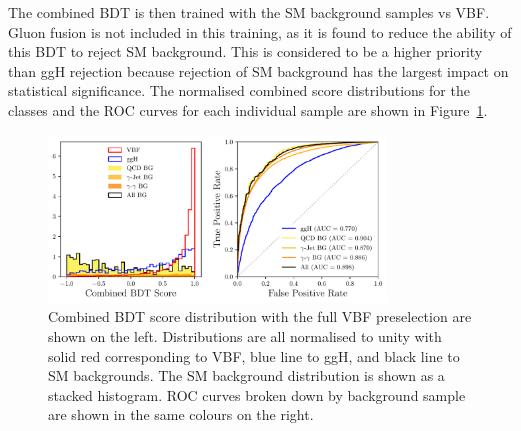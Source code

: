 The combined BDT is then trained with the SM background samples vs VBF. Gluon fusion is not included in this training, as it is found to reduce the ability of this BDT to reject SM background. This is considered to be a higher priority than ggH rejection because rejection of SM background has the largest impact on statistical significance.
The normalised combined score distributions for the classes and the ROC curves for each individual sample are shown in Figure~\ref{fig:event_categorisaton:combined_bdt_performance}.
\begin{figure}[h!]
    \centering
        \includegraphics[width=0.8\textwidth]{figures/event_selection/combined_BDT_PS.pdf}
    \caption{Combined BDT score distribution with the full VBF preselection are shown on the left. Distributions are all normalised to unity with solid red corresponding to VBF, blue line to ggH, and black line to SM backgrounds. The SM background distribution is shown as a stacked histogram. ROC curves broken down by background sample are shown in the same colours on the right.}
    \label{fig:event_categorisaton:combined_bdt_performance}
\end{figure}



